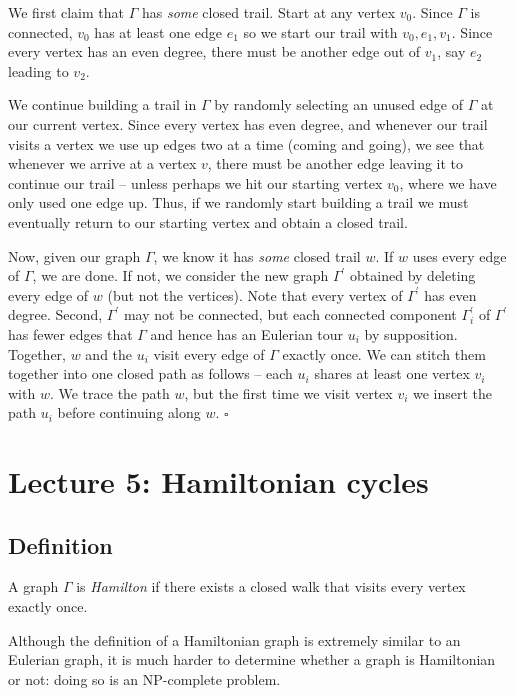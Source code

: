 \documentclass[]{article}
\begin{document}
We first claim that \(\Gamma\) has \emph{some} closed trail. Start at
any vertex \(v_0\). Since \(\Gamma\) is connected, \(v_0\) has at least
one edge \(e_1\) so we start our trail with \(v_0, e_1, v_1\). Since
every vertex has an even degree, there must be another edge out of
\(v_1\), say \(e_2\) leading to \(v_2\).

We continue building a trail in \(\Gamma\) by randomly selecting an
unused edge of \(\Gamma\) at our current vertex. Since every vertex has
even degree, and whenever our trail visits a vertex we use up edges two
at a time (coming and going), we see that whenever we arrive at a vertex
\(v\), there must be another edge leaving it to continue our trail --
unless perhaps we hit our starting vertex \(v_0\), where we have only
used one edge up. Thus, if we randomly start building a trail we must
eventually return to our starting vertex and obtain a closed trail.

Now, given our graph \(\Gamma\), we know it has \emph{some} closed trail
\(w\). If \(w\) uses every edge of \(\Gamma\), we are done. If not, we
consider the new graph \(\Gamma^\prime\) obtained by deleting every edge
of \(w\) (but not the vertices). Note that every vertex of
\(\Gamma^\prime\) has even degree. Second, \(\Gamma^\prime\) may not be
connected, but each connected component \(\Gamma_i^\prime\) of
\(\Gamma^\prime\) has fewer edges that \(\Gamma\) and hence has an
Eulerian tour \(u_i\) by supposition. Together, \(w\) and the \(u_i\)
visit every edge of \(\Gamma\) exactly once. We can stitch them together
into one closed path as follows -- each \(u_i\) shares at least one
vertex \(v_i\) with \(w\). We trace the path \(w\), but the first time
we visit vertex \(v_i\) we insert the path \(u_i\) before continuing
along \(w\). \(\square\)

\section{Lecture 5: Hamiltonian cycles}

\subsection{Definition}\label{definition-2}

A graph \(\Gamma\) is \emph{Hamilton} if there exists a closed walk that
visits every vertex exactly once.

Although the definition of a Hamiltonian graph is extremely similar to
an Eulerian graph, it is much harder to determine whether a graph is
Hamiltonian or not: doing so is an NP-complete problem.
\end{document}
